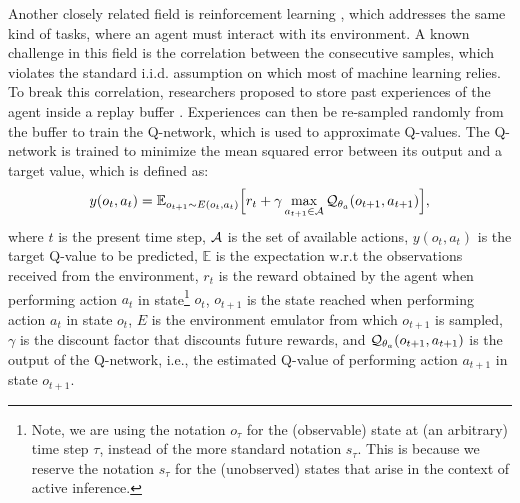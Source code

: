 \documentclass[twoside,11pt]{article}
\let\oldmathcal\mathcal
\renewcommand{\mathcal}[1]{%
  \IfSubStr{ABCDEFGHIJKLMNOPQRSTUVWXYZ}{#1}{\oldmathcal{#1}}{\mathdutchcal{#1}}
}
\begin{document}
Another closely related field is reinforcement learning \citep{DeepRL,DDQN,lample2016playing}, which addresses the same kind of tasks, where an agent must interact with its environment. A known challenge in this field is the correlation between the consecutive samples, which violates the standard i.i.d. assumption on which most of machine learning relies. To break this correlation, researchers proposed to store past experiences of the agent inside a replay buffer \citep{DeepRL}. Experiences can then be re-sampled randomly from the buffer to train the Q-network, which is used to approximate Q-values. The Q-network is trained to minimize the mean squared error between its output and a target value, which is defined as:
$$y(o_t,a_t) = \mathbb{E}_{o_{t+1} \sim E(o_t,a_t)}\Big[ r_t + \gamma \max_{a_{t+1} \in \mathcal{A}} \mathcal{Q}_{\theta_a}(o_{t+1}, a_{t+1})\Big],$$
where $t$ is the present time step, $\mathcal{A}$ is the set of available actions, $y(o_t,a_t)$ is the target Q-value to be predicted, $\mathbb{E}$ is the expectation w.r.t the observations received from the environment, $r_t$ is the reward obtained by the agent when performing action $a_t$ in state\footnote{Note, we are using the notation $o_\tau$ for the (observable) state at (an arbitrary) time step $\tau$, instead of the more standard notation $s_\tau$. This is because we reserve the notation $s_\tau$ for the (unobserved) states that arise in the context of active inference.} $o_t$, $o_{t+1}$ is the state reached when performing action $a_t$ in state $o_t$, $E$ is the environment emulator from which $o_{t+1}$ is sampled, $\gamma$ is the discount factor that discounts future rewards, and $\mathcal{Q}_{\theta_a}(o_{t+1}, a_{t+1})$ is the output of the Q-network, i.e., the estimated Q-value of performing action $a_{t+1}$ in state $o_{t+1}$.
\end{document}
